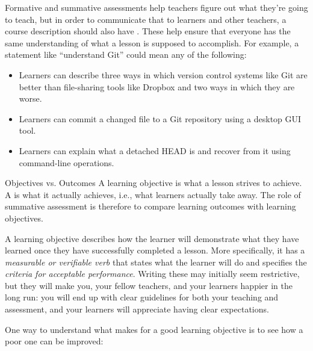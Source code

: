 
Formative and summative assessments help teachers figure out what they're going to teach,
but in order to communicate that to learners and other teachers,
a course description should also have .
These help ensure that
everyone has the same understanding of what a lesson is supposed to accomplish.
For example,
a statement like ``understand Git'' could mean any of the following:

\begin{itemize}

\item
  Learners can describe three ways
  in which version control systems like Git are better than file-sharing tools like Dropbox
  and two ways in which they are worse.

\item
  Learners can commit a changed file to a Git repository
  using a desktop GUI tool.

\item
  Learners can explain what a detached HEAD is
  and recover from it using command-line operations.

\end{itemize}

\begin{aside}{Objectives vs. Outcomes}
  A learning objective is what a lesson strives to achieve.
  A  is what it actually achieves,
  i.e., what learners actually take away.
  The role of summative assessment is therefore
  to compare learning outcomes with learning objectives.
\end{aside}

A learning objective describes how the learner will demonstrate what they have learned
once they have successfully completed a lesson.
More specifically,
it has a \emph{measurable or verifiable verb} that states what the learner will do
and specifies the \emph{criteria for acceptable performance}.
Writing these may initially seem restrictive,
but they will make you,
your fellow teachers,
and your learners happier in the long run:
you will end up with clear guidelines for both your teaching and assessment,
and your learners will appreciate having clear expectations.

One way to understand what makes for a good learning objective
is to see how a poor one can be improved:

